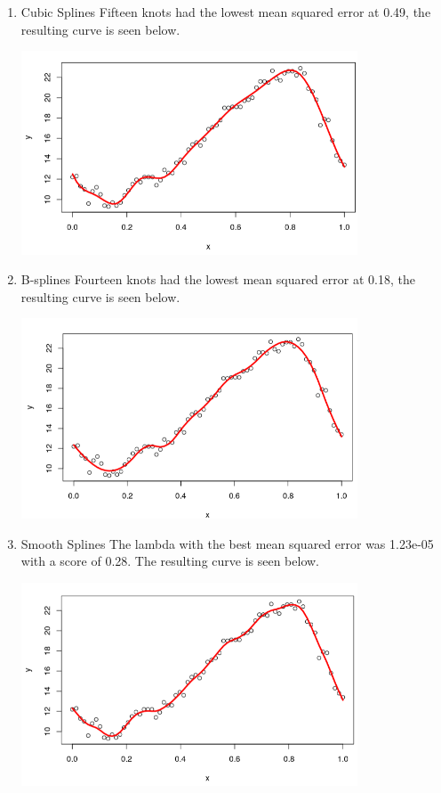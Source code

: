 \documentclass[12pt,letterpaper]{article}
\begin{document}
\begin{enumerate}[label=\alph*)]



\item Cubic Splines 
Fifteen knots had the lowest mean squared error at 0.49, the resulting curve is seen below.
\begin{center}
\includegraphics[width=10cm]{cspline.png}
\end{center}
 

\item  B-splines 
Fourteen knots had the lowest mean squared error at 0.18, the resulting curve is seen below.


\begin{center}
\includegraphics[width=10cm]{bspline.png} 
\end{center}

\item  Smooth Splines 
The lambda with the best mean squared error was 1.23e-05 with a score of 0.28.  The resulting curve is seen below.

\begin{center}
\includegraphics[width=10cm]{sspline.png} 
\end{center}



\end{enumerate}
\end{document}
